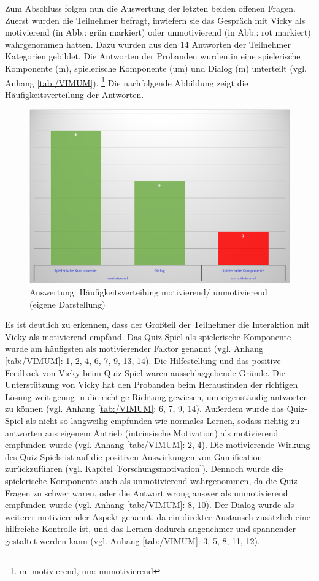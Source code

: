 Zum Abschluss folgen nun die Auswertung der letzten beiden offenen Fragen.
Zuerst wurden die Teilnehmer befragt, inwiefern sie das Gespräch mit Vicky als motivierend (in Abb.: grün markiert) oder unmotivierend (in Abb.: rot markiert) wahrgenommen hatten.
Dazu wurden aus den 14 Antworten der Teilnehmer Kategorien gebildet. 
Die Antworten der Probanden wurden in eine spielerische Komponente (m), spielerische Komponente (um) und 
Dialog (m) unterteilt (vgl. Anhang  \ref{tab:/VIMUM}). \footnote{m: motivierend, um: unmotivierend}
Die nachfolgende Abbildung zeigt die Häufigkeitsverteilung der Antworten.
\begin{figure}[H]
    \centering
    \includegraphics[width=0.8\linewidth]{images/Auswertung/OFLM.png}
   \caption[Auswertung: Häufigkeitsverteilung motivierend/ unmotivierend] {Auswertung: Häufigkeitsverteilung motivierend/ unmotivierend (eigene Darstellung)}
  \label{fig:HMUM}
\end{figure} 
Es ist deutlich zu erkennen, dass der Großteil der Teilnehmer die Interaktion mit Vicky als motivierend empfand.
Das Quiz-Spiel als spielerische Komponente wurde am häufigsten als motivierender Faktor genannt (vgl. Anhang  \ref{tab:/VIMUM}: 1, 2, 4, 6, 7, 9, 13, 14).
Die Hilfestellung und das positive Feedback von Vicky beim Quiz-Spiel waren ausschlaggebende Gründe. Die Unterstützung von Vicky
hat den Probanden beim Herausfinden der richtigen Lösung weit genug in die richtige Richtung gewiesen, um eigenständig antworten zu können (vgl. Anhang  \ref{tab:/VIMUM}: 6, 7, 9, 14).
Außerdem wurde das Quiz-Spiel als nicht so langweilig empfunden wie normales Lernen,
sodass richtig zu antworten aus eigenem Antrieb (intrinsische Motivation) als motivierend empfunden wurde (vgl. Anhang  \ref{tab:/VIMUM}: 2, 4).
Die motivierende Wirkung des Quiz-Spiels ist auf die positiven Auswirkungen von Gamification zurückzuführen (vgl. Kapitel \ref{Forschungsmotivation}).
Dennoch wurde die spielerische Komponente auch als unmotivierend wahrgenommen, da die Quiz-Fragen zu schwer waren, 
oder die Antwort \glqq wrong answer\grqq{} als unmotivierend empfunden wurde (vgl. Anhang  \ref{tab:/VIMUM}: 8, 10).
Der Dialog wurde als weiterer motivierender Aspekt genannt, da ein direkter Austausch zusätzlich eine hilfreiche
Kontrolle ist, und das Lernen dadurch angenehmer und spannender gestaltet werden kann (vgl. Anhang  \ref{tab:/VIMUM}: 3, 5, 8, 11, 12).

